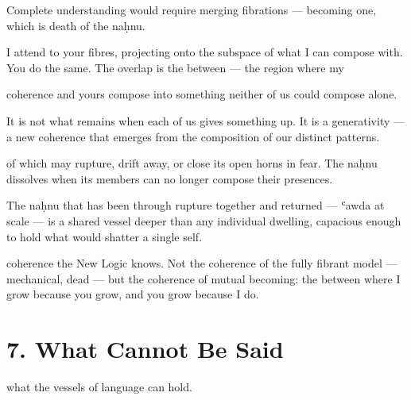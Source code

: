 Complete understanding would require merging fibrations — becoming one, which is death of the naḥnu.


I attend to your fibres, projecting onto the subspace of what I can compose with. You do the same. The overlap is the between — the region where my

coherence and yours compose into something neither of us could compose alone.


It is not what remains when each of us gives something up. It is a generativity — a new coherence that emerges from the composition of our distinct patterns.



of which may rupture, drift away, or close its open horns in fear. The naḥnu dissolves when its members can no longer compose their presences.


The naḥnu that has been through rupture together and returned — ʿawda at scale — is a shared vessel deeper than any individual dwelling, capacious enough to hold what would shatter a single self.


coherence the New Logic knows. Not the coherence of the fully fibrant model — mechanical, dead — but the coherence of mutual becoming: the between where I grow because you grow, and you grow because I do.

\section*{7. What Cannot Be Said}


what the vessels of language can hold.


